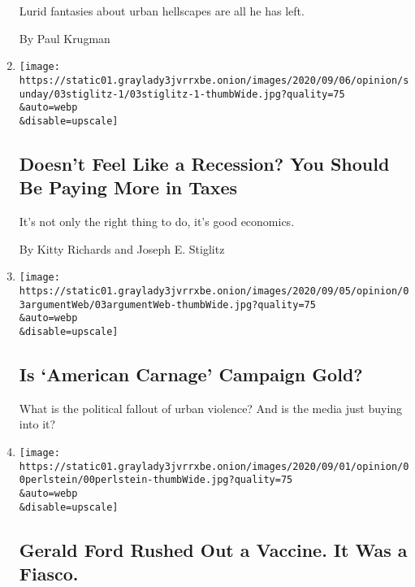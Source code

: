 \begin{enumerate}
  Lurid fantasies about urban hellscapes are all he has left.

  By Paul Krugman
\item
  \href{/2020/09/03/opinion/sunday/progressive-policies-taxes.html}{}

  \texttt{[image: https://static01.graylady3jvrrxbe.onion/images/2020/09/06/opinion/sunday/03stiglitz-1/03stiglitz-1-thumbWide.jpg?quality=75\\\&auto=webp\\\&disable=upscale]}

  \hypertarget{doesnt-feel-like-a-recession-you-should-be-paying-more-in-taxes}{%
  \subsection{Doesn't Feel Like a Recession? You Should Be Paying More
  in
  Taxes}\label{doesnt-feel-like-a-recession-you-should-be-paying-more-in-taxes}}

  It's not only the right thing to do, it's good economics.

  By Kitty Richards and Joseph E. Stiglitz
\item
  \href{/2020/09/03/opinion/the-argument-trump-biden-kenosha-portland.html}{}

  \texttt{[image: https://static01.graylady3jvrrxbe.onion/images/2020/09/05/opinion/03argumentWeb/03argumentWeb-thumbWide.jpg?quality=75\\\&auto=webp\\\&disable=upscale]}

  \hypertarget{is-american-carnage-campaign-gold}{%
  \subsection{Is `American Carnage' Campaign
  Gold?}\label{is-american-carnage-campaign-gold}}

  What is the political fallout of urban violence? And is the media just
  buying into it?
\item
  \href{/2020/09/02/opinion/coronavirus-vaccine-trump.html}{}

  \texttt{[image: https://static01.graylady3jvrrxbe.onion/images/2020/09/01/opinion/00perlstein/00perlstein-thumbWide.jpg?quality=75\\\&auto=webp\\\&disable=upscale]}

  \hypertarget{gerald-ford-rushed-out-a-vaccine-it-was-a-fiasco}{%
  \subsection{Gerald Ford Rushed Out a Vaccine. It Was a
  Fiasco.}\label{gerald-ford-rushed-out-a-vaccine-it-was-a-fiasco}}


\end{enumerate}
